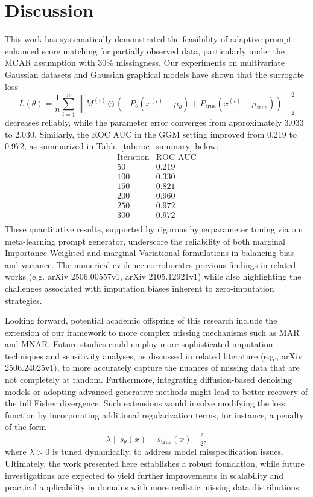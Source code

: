 \documentclass{article}
\begin{document}
\section{Discussion}
This work has systematically demonstrated the feasibility of adaptive prompt-enhanced score matching for partially observed data, particularly under the MCAR assumption with 30\% missingness. Our experiments on multivariate Gaussian datasets and Gaussian graphical models have shown that the surrogate loss 
\[
L(\theta) = \frac{1}{n} \sum_{i=1}^n \left\| M^{(i)} \odot \left(-P_\theta (x^{(i)} - \mu_\theta) + P_{\mathrm{true}} (x^{(i)} - \mu_{\mathrm{true}})\right) \right\|_2^2
\]
decreases reliably, while the parameter error converges from approximately 3.033 to 2.030. Similarly, the ROC AUC in the GGM setting improved from 0.219 to 0.972, as summarized in Table~\ref{tab:roc_summary} below:
\[
\begin{array}{c|c}
\text{Iteration} & \text{ROC AUC} \\ \hline
50 & 0.219 \\
100 & 0.330 \\
150 & 0.821 \\
200 & 0.960 \\
250 & 0.972 \\
300 & 0.972 \\
\end{array}
\]
These quantitative results, supported by rigorous hyperparameter tuning via our meta-learning prompt generator, underscore the reliability of both marginal Importance-Weighted and marginal Variational formulations in balancing bias and variance. The numerical evidence corroborates previous findings in related works (e.g. arXiv 2506.00557v1, arXiv 2105.12921v1) while also highlighting the challenges associated with imputation biases inherent to zero-imputation strategies.

Looking forward, potential academic offspring of this research include the extension of our framework to more complex missing mechanisms such as MAR and MNAR. Future studies could employ more sophisticated imputation techniques and sensitivity analyses, as discussed in related literature (e.g., arXiv 2506.24025v1), to more accurately capture the nuances of missing data that are not completely at random. Furthermore, integrating diffusion-based denoising models or adopting advanced generative methods might lead to better recovery of the full Fisher divergence. Such extensions would involve modifying the loss function by incorporating additional regularization terms, for instance, a penalty of the form
\[
\lambda \left\| s_\theta(x) - s_{\mathrm{true}}(x) \right\|_2^2,
\]
where \(\lambda > 0\) is tuned dynamically, to address model misspecification issues. Ultimately, the work presented here establishes a robust foundation, while future investigations are expected to yield further improvements in scalability and practical applicability in domains with more realistic missing data distributions.
\end{document}
